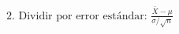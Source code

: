 \documentclass[preview]{standalone}
\begin{document}
\begin{align*}
\text{2. Dividir por error estándar: } \frac{\bar{X} - \mu}{\sigma / \sqrt{n}}
\end{align*}
\end{document}
